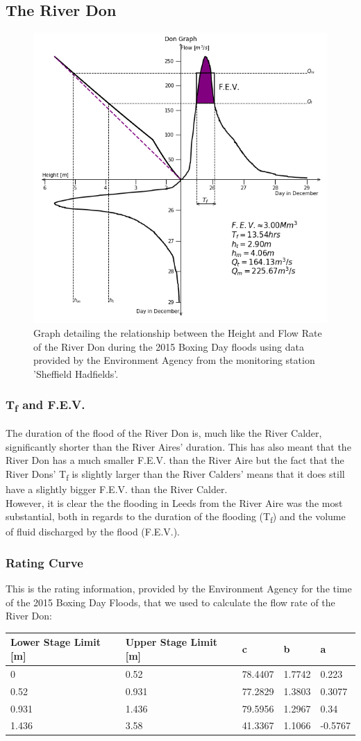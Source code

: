 \documentclass[11 pt, a4paper]{article}
\begin{document}
\subsection{The River Don}
\begin{figure}[H]
\begin{center}
\includegraphics[width=.5\linewidth]{Don-Quadrant_Graph.png}
\caption{Graph detailing the relationship between the Height and Flow Rate of the River Don during the 2015 Boxing Day floods using data provided by the Environment Agency from the monitoring station 'Sheffield Hadfields'.}
\end{center}
\end{figure}
\subsubsection{T\textsubscript{f} and F.E.V.}
The duration of the flood of the River Don is, much like the River Calder, significantly shorter than the River Aires' duration. This has also meant that the River Don has a much smaller F.E.V. than the River Aire but the fact that the River Dons' T\textsubscript{f} is slightly larger than the River Calders' means that it does still have a slightly bigger F.E.V. than the River Calder. \\
However, it is clear the the flooding in Leeds from the River Aire was the most substantial, both in regards to the duration of the flooding (T\textsubscript{f}) and the volume of fluid discharged by the flood (F.E.V.).\\
\subsubsection{Rating Curve}
This is the rating information, provided by the Environment Agency for the time of the 2015 Boxing Day Floods, that we used to calculate the flow rate of the River Don:
\begin{center}
\begin{tabular}{|l|l|l|l|l|}
\hline
Lower Stage Limit {[}m{]} & Upper Stage Limit {[}m{]} & c & b & a \\
\hline
0 & 0.52 & 78.4407 & 1.7742 & 0.223 \\
0.52 & 0.931 & 77.2829 & 1.3803 & 0.3077 \\
0.931 & 1.436 & 79.5956 & 1.2967 & 0.34 \\
1.436 & 3.58 & 41.3367 & 1.1066 & -0.5767 \\
\hline
\end{tabular}
\end{center}
\end{document}
